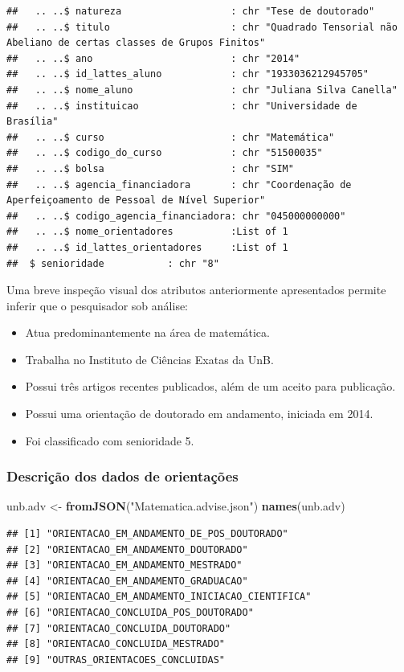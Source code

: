 \documentclass[]{article}
\newenvironment{Shaded}{\begin{snugshade}}{\end{snugshade}}
\newcommand{\KeywordTok}[1]{\textcolor[rgb]{0.13,0.29,0.53}{\textbf{#1}}}
\newcommand{\StringTok}[1]{\textcolor[rgb]{0.31,0.60,0.02}{#1}}
\newcommand{\NormalTok}[1]{#1}
\providecommand{\tightlist}{%
  \setlength{\itemsep}{0pt}\setlength{\parskip}{0pt}}
\begin{document}
\begin{verbatim}
##   .. ..$ natureza                   : chr "Tese de doutorado"
##   .. ..$ titulo                     : chr "Quadrado Tensorial não Abeliano de certas classes de Grupos Finitos"
##   .. ..$ ano                        : chr "2014"
##   .. ..$ id_lattes_aluno            : chr "1933036212945705"
##   .. ..$ nome_aluno                 : chr "Juliana Silva Canella"
##   .. ..$ instituicao                : chr "Universidade de Brasília"
##   .. ..$ curso                      : chr "Matemática"
##   .. ..$ codigo_do_curso            : chr "51500035"
##   .. ..$ bolsa                      : chr "SIM"
##   .. ..$ agencia_financiadora       : chr "Coordenação de Aperfeiçoamento de Pessoal de Nível Superior"
##   .. ..$ codigo_agencia_financiadora: chr "045000000000"
##   .. ..$ nome_orientadores          :List of 1
##   .. ..$ id_lattes_orientadores     :List of 1
##  $ senioridade           : chr "8"
\end{verbatim}

Uma breve inspeção visual dos atributos anteriormente apresentados
permite inferir que o pesquisador sob análise:

\begin{itemize}
\tightlist
\item
  Atua predominantemente na área de matemática.
\item
  Trabalha no Instituto de Ciências Exatas da UnB.
\item
  Possui três artigos recentes publicados, além de um aceito para
  publicação.
\item
  Possui uma orientação de doutorado em andamento, iniciada em 2014.
\item
  Foi classificado com senioridade 5.
\end{itemize}

\subsubsection{Descrição dos dados de
orientações}\label{descricao-dos-dados-de-orientacoes}

\begin{Shaded}
\begin{Highlighting}[]
\NormalTok{unb.adv <-}\StringTok{ }\KeywordTok{fromJSON}\NormalTok{(}\StringTok{"Matematica.advise.json"}\NormalTok{)}
\KeywordTok{names}\NormalTok{(unb.adv)}
\end{Highlighting}
\end{Shaded}

\begin{verbatim}
## [1] "ORIENTACAO_EM_ANDAMENTO_DE_POS_DOUTORADO"    
## [2] "ORIENTACAO_EM_ANDAMENTO_DOUTORADO"           
## [3] "ORIENTACAO_EM_ANDAMENTO_MESTRADO"            
## [4] "ORIENTACAO_EM_ANDAMENTO_GRADUACAO"           
## [5] "ORIENTACAO_EM_ANDAMENTO_INICIACAO_CIENTIFICA"
## [6] "ORIENTACAO_CONCLUIDA_POS_DOUTORADO"          
## [7] "ORIENTACAO_CONCLUIDA_DOUTORADO"              
## [8] "ORIENTACAO_CONCLUIDA_MESTRADO"               
## [9] "OUTRAS_ORIENTACOES_CONCLUIDAS"
\end{verbatim}
\end{document}
